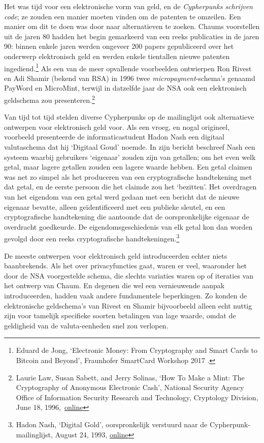 \documentclass[
  a5paper,
  smalldemyvopaper,11pt,twoside,onecolumn,openright,extrafontsizes,
hidelinks]{memoir}
\begin{document}
Het was tijd voor een elektronische vorm van geld, en de
\emph{Cypherpunks schrijven code}; ze zouden een manier moeten vinden om
de patenten te omzeilen. Een manier om dit te doen was door naar
alternatieven te zoeken. Chaums voorstellen uit de jaren 80 hadden het
begin gemarkeerd van een reeks publicaties in de jaren 90: binnen enkele
jaren werden ongeveer 200 papers gepubliceerd over het onderwerp
elektronisch geld en werden enkele tientallen nieuwe patenten
ingediend.\footnote{Eduard de Jong, `Electronic Money: From Cryptography
  and Smart Cards to Bitcoin and Beyond', Fraunhofer SmartCard Workshop
  2017 .} Als een van de meer opvallende voorbeelden ontwierpen Ron
Rivest en Adi Shamir (bekend van RSA) in 1996 twee
\emph{micropayment}-schema's genaamd PayWord en MicroMint, terwijl in
datzelfde jaar de NSA ook een elektronisch geldschema zou
presenteren.\footnote{Laurie Law, Susan Sabett, and Jerry Solinas, `How
  To Make a Mint: The Cryptography of Anonymous Electronic Cash',
  National Security Agency Office of Information Security Research and
  Technology, Cryptology Division, June 18,
  1996,~\href{https://groups.csail.mit.edu/mac/classes/6.805/articles/money/nsamint/nsamint.htm}{online}}

Van tijd tot tijd stelden diverse Cypherpunks op de mailinglijst ook
alternatieve ontwerpen voor elektronisch geld voor. Als een vroeg, en
nogal origineel, voorbeeld presenteerde de informaticastudent Hadon Nash
een digitaal valutaschema dat hij `Digitaal Goud' noemde. In zijn
bericht beschreef Nash een systeem waarbij gebruikers `eigenaar' zouden
zijn van getallen; om het even welk getal, maar lagere getallen zouden
een lagere waarde hebben. Een getal claimen was net zo simpel als het
produceren van een cryptografische handtekening met dat getal, en de
eerste persoon die het claimde zou het `bezitten'. Het overdragen van
het eigendom van een getal werd gedaan met een bericht dat de nieuwe
eigenaar bevatte, alleen geïdentificeerd met een publieke sleutel, en
een cryptografische handtekening die aantoonde dat de oorspronkelijke
eigenaar de overdracht goedkeurde. De eigendomsgeschiedenis van elk
getal kon dan worden gevolgd door een reeks cryptografische
handtekeningen.\footnote{Hadon Nash, `Digital Gold', oorspronkelijk
  verstuurd naar de Cypherpunk-mailinglijst, August 24, 1993,
  \href{https://cypherpunks.venona.com/date/1993/08/msg00698.html}{online}}

De meeste ontwerpen voor elektronisch geld introduceerden echter niets
baanbrekends. Als het over privacyfuncties gaat, waren er veel,
waaronder het door de NSA voorgestelde schema, die slechts variaties
waren op of iteraties van het ontwerp van Chaum. En degenen die wel een
vernieuwende aanpak introduceerden, hadden vaak andere fundamentele
beperkingen. Zo konden de elektronische geldschema's van Rivest en
Shamir bijvoorbeeld alleen echt nuttig zijn voor tamelijk specifieke
soorten betalingen van lage waarde, omdat de geldigheid van de
valuta-eenheden snel zou verlopen.
\end{document}
